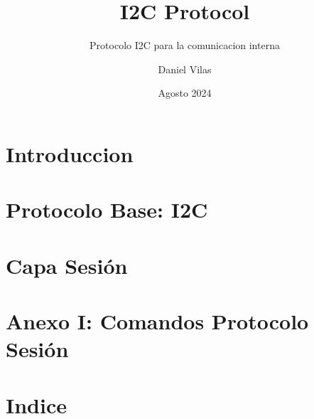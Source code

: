\documentclass[spanish]{DccDiyTools/DccDiyTools}
\title{I2C Protocol}
\subtitle{Protocolo I2C para la comunicacion interna}
\author{Daniel Vilas}
\date{Agosto 2024}
\begin{document}
\maketitle{}
\newpage{}
\section{Introduccion}


\newpage{}
\section{Protocolo Base: I2C}


\newpage{}
\section{Capa Sesión}



\newpage{}
\section{Anexo I: Comandos Protocolo Sesión} %



\newpage{}
\section{Indice}
\tableofcontents{}

\listoffigures{}
\listoftables{}
\end{document}
